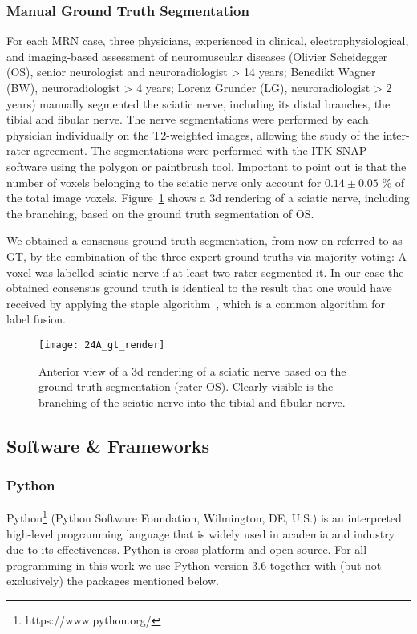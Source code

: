 \subsubsection{Manual Ground Truth Segmentation} \label{dataset_gt}
For each MRN case, three physicians, experienced in clinical, electrophysiological, and imaging-based assessment of neuromuscular diseases (Olivier Scheidegger (OS), senior neurologist and neuroradiologist > 14 years; Benedikt Wagner (BW), neuroradiologist > 4 years; Lorenz Grunder (LG), neuroradiologist > 2 years) manually segmented the sciatic nerve, including its distal branches, the tibial and fibular nerve. The nerve segmentations were performed by each physician individually on the T2-weighted images, allowing the study of the inter-rater agreement. The segmentations were performed with the ITK-SNAP~\cite{py06nimg} software using the polygon or paintbrush tool. Important to point out is that the number of voxels belonging to the sciatic nerve only account for $0.14 \pm 0.05$ \% of the total image voxels. Figure~\ref{fig:gt_render} shows a \gls{3d} rendering of a sciatic nerve, including the branching, based on the ground truth segmentation of OS.

We obtained a consensus ground truth segmentation, from now on referred to as GT, by the combination of the three expert ground truths via majority voting: A voxel was labelled sciatic nerve if at least two rater segmented it. In our case the obtained consensus ground truth is identical to the result that one would have received by applying the \gls{staple} algorithm~\cite{Warfield2004SimultaneousSTAPLE}, which is a common algorithm for label fusion.\\

\begin{figure}[htbp]
	\texttt{[image: 24A\_gt\_render]}
    \caption[3-D Rendering of a Ground Truth]{Anterior view of a \gls{3d} rendering of a sciatic nerve based on the ground truth segmentation (rater OS). Clearly visible is the branching of the sciatic nerve into the tibial and fibular nerve.}
    \label{fig:gt_render}
\end{figure}

\subsection{Software \& Frameworks}
\subsubsection{Python}
Python\footnote{https://www.python.org/} (Python Software Foundation, Wilmington, DE, U.S.) is an interpreted high-level programming language that is widely used in academia and industry due to its effectiveness. Python is cross-platform and open-source. For all programming in this work we use Python version 3.6 together with (but not exclusively) the packages mentioned below.

